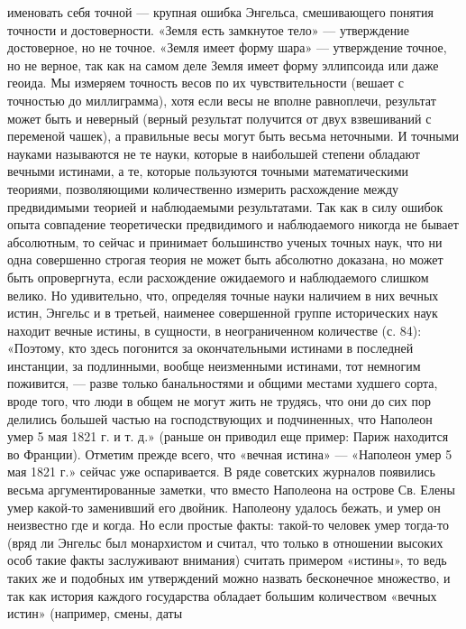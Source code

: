 именовать  себя  точной  ---  крупная  ошибка  Энгельса,  смешивающего
понятия  точности и  достоверности.  «Земля есть  замкнутое тело»  ---
утверждение достоверное,  но не точное.  «Земля имеет форму  шара» ---
утверждение  точное,  но  не  верное,  так как  на  самом  деле  Земля
имеет форму  эллипсоида или  даже геоида.  Мы измеряем  точность весов
по  их  чувствительности (вешает  с  точностью  до миллиграмма),  хотя
если  весы  не вполне  равноплечи,  результат  может быть  и  неверный
(верный результат получится от двух  взвешиваний с переменой чашек), а
правильные  весы  могут  быть  весьма  неточными.  И  точными  науками
называются не те науки, которые  в наибольшей степени обладают вечными
истинами, а  те, которые пользуются точными  математическими теориями,
позволяющими  количественно  измерить расхождение  между  предвидимыми
теорией  и наблюдаемыми  результатами.  Так как  в  силу ошибок  опыта
совпадение теоретически предвидимого и  наблюдаемого никогда не бывает
абсолютным, то сейчас и принимает  большинство ученых точных наук, что
ни одна совершенно строгая теория не может быть абсолютно доказана, но
может быть  опровергнута, если  расхождение ожидаемого  и наблюдаемого
слишком велико. Но удивительно, что, определяя точные науки наличием в
них вечных  истин, Энгельс  и в  третьей, наименее  совершенной группе
исторических наук находит вечные  истины, в сущности, в неограниченном
количестве (с.  84): «Поэтому,  кто здесь погонится  за окончательными
истинами  в последней  инстанции,  за  подлинными, вообще  неизменными
истинами,  тот немногим  поживится, ---  разве только  банальностями и
общими местами  худшего сорта, вроде того,  что люди в общем  не могут
жить  не трудясь,  что  они  до сих  пор  делились  большей частью  на
господствующих и подчиненных, что Наполеон умер 5 мая 1821 г. и т. д.»
(раньше он приводил  еще пример: Париж находится  во Франции). Отметим
прежде всего,  что «вечная истина» ---  «Наполеон умер 5 мая  1821 г.»
сейчас уже  оспаривается. В  ряде советских журналов  появились весьма
аргументированные заметки,  что вместо Наполеона на  острове Св. Елены
умер какой-то заменивший его двойник. Наполеону удалось бежать, и умер
он неизвестно  где и  когда. Но если  простые факты:  такой-то человек
умер тогда-то (вряд ли Энгельс был  монархистом и считал, что только в
отношении  высоких  особ  такие факты  заслуживают  внимания)  считать
примером «истины»,  то ведь таких  же и подобных им  утверждений можно
назвать бесконечное  множество, и так как  история каждого государства
обладает  большим количеством  «вечных истин»  (например, смены,  даты
